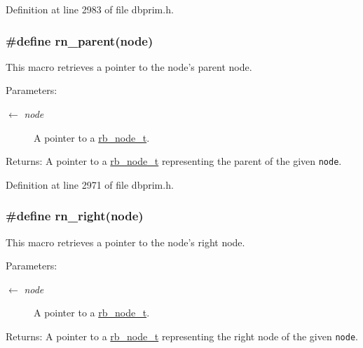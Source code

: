 Definition at line 2983 of file dbprim.h.\hypertarget{group__dbprim__rbtree_ga35}{
\subsubsection[rn\_\-parent]{\setlength{\rightskip}{0pt plus 5cm}\#define rn\_\-parent(node)}}
\label{group__dbprim__rbtree_ga35}


This macro retrieves a pointer to the node's parent node.

\begin{Desc}
\item[Parameters:]
\begin{description}
\item[\mbox{$\leftarrow$} {\em node}]A pointer to a \hyperlink{group__dbprim__rbtree_ga1}{rb\_\-node\_\-t}.\end{description}
\end{Desc}
\begin{Desc}
\item[Returns:]A pointer to a \hyperlink{group__dbprim__rbtree_ga1}{rb\_\-node\_\-t} representing the parent of the given {\tt node}.\end{Desc}


Definition at line 2971 of file dbprim.h.\hypertarget{group__dbprim__rbtree_ga37}{
\subsubsection[rn\_\-right]{\setlength{\rightskip}{0pt plus 5cm}\#define rn\_\-right(node)}}
\label{group__dbprim__rbtree_ga37}


This macro retrieves a pointer to the node's right node.

\begin{Desc}
\item[Parameters:]
\begin{description}
\item[\mbox{$\leftarrow$} {\em node}]A pointer to a \hyperlink{group__dbprim__rbtree_ga1}{rb\_\-node\_\-t}.\end{description}
\end{Desc}
\begin{Desc}
\item[Returns:]A pointer to a \hyperlink{group__dbprim__rbtree_ga1}{rb\_\-node\_\-t} representing the right node of the given {\tt node}.\end{Desc}


